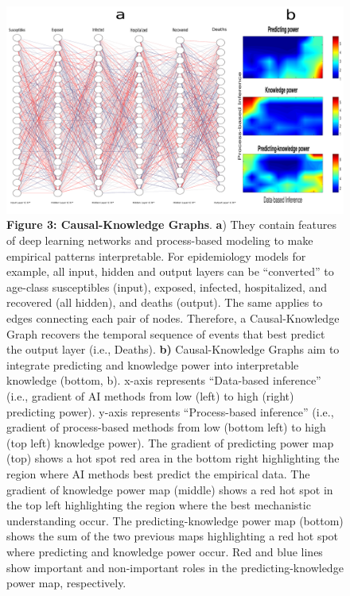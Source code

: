 \documentclass[11pt, a4paper]{article} %
\begin{document}
 \begin{figure}[h!]
   \includegraphics[width=1\textwidth]{Figures/Figure3integrated.pdf}
   {\small {\bf Figure 3: Causal-Knowledge Graphs}. {\bf a}) They
     contain features of deep learning networks and process-based
     modeling to make empirical patterns interpretable. For
     epidemiology models for example, all input, hidden and output
     layers can be ``converted'' to age-class susceptibles (input),
     exposed, infected, hospitalized, and recovered (all hidden), and
     deaths (output). The same applies to edges connecting each pair
     of nodes. Therefore, a Causal-Knowledge Graph recovers the
     temporal sequence of events that best predict the output layer
     (i.e., Deaths). {\bf b)} Causal-Knowledge Graphs aim to integrate
     predicting and knowledge power into interpretable knowledge
     (bottom, b). x-axis represents ``Data-based inference'' (i.e.,
     gradient of AI methods from low (left) to high (right) predicting
     power). y-axis represents ``Process-based inference'' (i.e.,
     gradient of process-based methods from low (bottom left) to high
     (top left) knowledge power). The gradient of predicting power map
     (top) shows a hot spot red area in the bottom right highlighting
     the region where AI methods best predict the empirical data. The
     gradient of knowledge power map (middle) shows a red hot spot in
     the top left highlighting the region where the best mechanistic
     understanding occur. The predicting-knowledge power map (bottom)
     shows the sum of the two previous maps highlighting a red hot
     spot where predicting and knowledge power occur. Red and blue
     lines show important and non-important roles in the
     predicting-knowledge power map, respectively.}
\end{figure}
  
\end{document}
